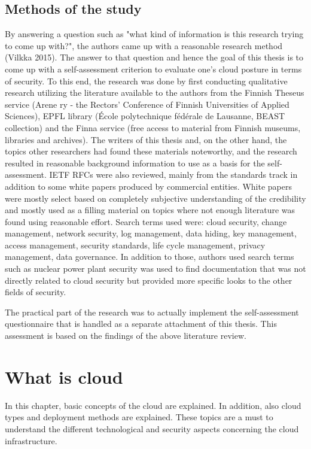 \documentclass{article}
\begin{document}
\subsection{Methods of the study}
By answering a question such as "what kind of information is this research trying to come up with?", the authors came up with a reasonable research method (Vilkka 2015).
The answer to that question and hence the goal of this thesis is to come up with a self-assessment criterion to evaluate one's cloud posture in terms of security.
To this end, the research was done by first conducting qualitative research utilizing the literature available to the authors from the Finnish Theseus service (Arene ry - the Rectors' Conference of Finnish Universities of Applied Sciences), EPFL library (École polytechnique fédérale de Lausanne, BEAST collection) and the Finna service (free access to material from Finnish museums, libraries and archives). The writers of this thesis and, on the other hand, the topics other researchers had found these materials noteworthy, and the research resulted in reasonable background information to use as a basis for the self-assessment. IETF RFCs were also reviewed, mainly from the standards track in addition to some white papers produced by commercial entities. White papers were mostly select based on completely subjective understanding of the credibility and mostly used as a filling material on topics where not enough literature was found using reasonable effort. Search terms used were: cloud security, change management, network security, log management, data hiding, key management, access management, security standards, life cycle management, privacy management, data governance. In addition to those, authors used search terms such as nuclear power plant security was used to find documentation that was not directly related to cloud security but provided more specific looks to the other fields of security.
\par
The practical part of the research was to actually implement the self-assessment questionnaire that is handled as a separate attachment of this thesis. This assessment is based on the findings of the above literature review.
\section{What is cloud}
In this chapter, basic concepts of the cloud are explained. In addition, also cloud types and deployment methods are explained. These topics are a must to understand the different technological and security aspects concerning the cloud infrastructure.
\end{document}
